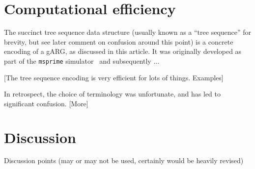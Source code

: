\documentclass{article}
\begin{document}
\section*{Computational efficiency}
The succinct tree sequence data structure (usually known as a ``tree sequence''
for brevity, but see later comment on confusion around this point)
is a concrete encoding of a gARG, as discussed in this article.
It was originally developed as part of the \texttt{msprime}
simulator~\cite{kelleher2016efficient} and subsequently ...

[The tree sequence encoding is very efficient for lots of things. Examples]

In retrospect, the choice of terminology was unfortunate, and has led to
significant confusion. [More]



\section*{Discussion}

Discussion points (may or may not be used, certainly would be heavily revised)
\end{document}
